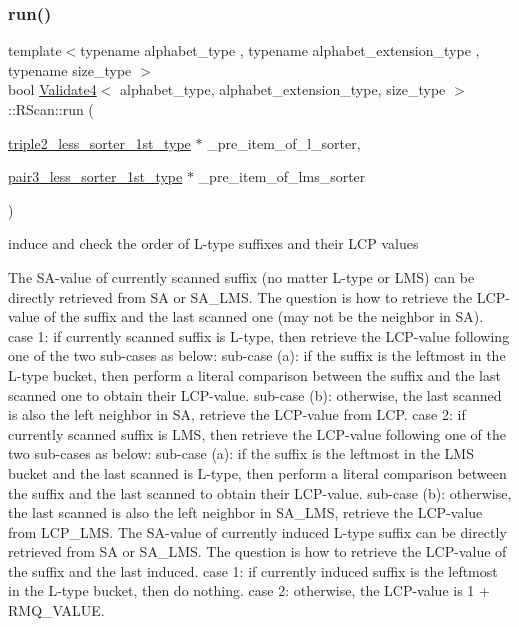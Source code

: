 \subsubsection{\texorpdfstring{run()}{run()}}
{\footnotesize\ttfamily template$<$typename alphabet\+\_\+type , typename alphabet\+\_\+extension\+\_\+type , typename size\+\_\+type $>$ \\
bool \hyperlink{class_validate4}{Validate4}$<$ alphabet\+\_\+type, alphabet\+\_\+extension\+\_\+type, size\+\_\+type $>$\+::R\+Scan\+::run (\begin{DoxyParamCaption}\item[{\hyperlink{class_validate4_a4c1bcea817e34f96d95c99e0694bbfc8}{triple2\+\_\+less\+\_\+sorter\+\_\+1st\+\_\+type} $\ast$}]{\+\_\+pre\+\_\+item\+\_\+of\+\_\+l\+\_\+sorter,  }\item[{\hyperlink{class_validate4_aff3135d55f749682df7e0f97c82a6769}{pair3\+\_\+less\+\_\+sorter\+\_\+1st\+\_\+type} $\ast$}]{\+\_\+pre\+\_\+item\+\_\+of\+\_\+lms\+\_\+sorter }\end{DoxyParamCaption})\hspace{0.3cm}{\ttfamily [inline]}}



induce and check the order of L-\/type suffixes and their L\+CP values 

The S\+A-\/value of currently scanned suffix (no matter L-\/type or L\+MS) can be directly retrieved from SA or S\+A\+\_\+\+L\+MS. The question is how to retrieve the L\+C\+P-\/value of the suffix and the last scanned one (may not be the neighbor in SA). case 1\+: if currently scanned suffix is L-\/type, then retrieve the L\+C\+P-\/value following one of the two sub-\/cases as below\+: sub-\/case (a)\+: if the suffix is the leftmost in the L-\/type bucket, then perform a literal comparison between the suffix and the last scanned one to obtain their L\+C\+P-\/value. sub-\/case (b)\+: otherwise, the last scanned is also the left neighbor in SA, retrieve the L\+C\+P-\/value from L\+CP. case 2\+: if currently scanned suffix is L\+MS, then retrieve the L\+C\+P-\/value following one of the two sub-\/cases as below\+: sub-\/case (a)\+: if the suffix is the leftmost in the L\+MS bucket and the last scanned is L-\/type, then perform a literal comparison between the suffix and the last scanned to obtain their L\+C\+P-\/value. sub-\/case (b)\+: otherwise, the last scanned is also the left neighbor in S\+A\+\_\+\+L\+MS, retrieve the L\+C\+P-\/value from L\+C\+P\+\_\+\+L\+MS. The S\+A-\/value of currently induced L-\/type suffix can be directly retrieved from SA or S\+A\+\_\+\+L\+MS. The question is how to retrieve the L\+C\+P-\/value of the suffix and the last induced. case 1\+: if currently induced suffix is the leftmost in the L-\/type bucket, then do nothing. case 2\+: otherwise, the L\+C\+P-\/value is 1 + R\+M\+Q\+\_\+\+V\+A\+L\+UE. 

